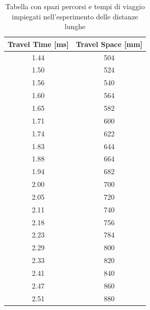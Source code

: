 \documentclass[10pt, a4paper, italian]{article}
\begin{document}
\begin{table}[H]
\centering
	\begin{tabular}{cc}
	\hline
	Travel Time [ms] & Travel Space [mm] \\ \hline
	1.44                              & 504                                  \\
	1.50                              & 524                                  \\
	1.56                              & 540                                  \\
	1.60                              & 564                                  \\
	1.65                              & 582                                  \\
	1.71                              & 600                                  \\
	1.74                              & 622                                  \\
	1.83                              & 644                                  \\
	1.88                              & 664                                  \\
	1.94                              & 682                                  \\
	2.00                              & 700                                  \\
	2.05                              & 720                                  \\
	2.11                              & 740                                  \\
	2.18                              & 756                                  \\
	2.23                              & 784                                  \\
	2.29                              & 800                                  \\
	2.33                              & 820                                  \\
	2.41                              & 840                                  \\
	2.47                              & 860                                  \\
	2.51                              & 880                                 
	\end{tabular}
	\caption{Tabella con spazi percorsi e tempi di viaggio impiegati nell'esperimento delle distanze lunghe}
\end{table}
\end{document}
